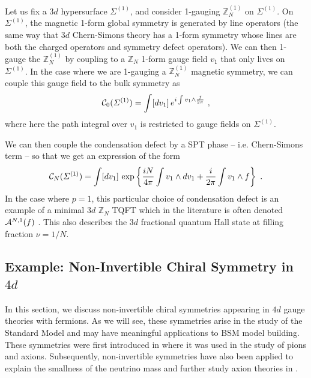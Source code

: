 \documentclass[11pt]{article}
\newcommand{\eq}[1]{\begin{align}\begin{split}#1\end{split}\end{align}}
\def\CA{{\cal A}}
\def\CC {{\cal C}}
\def\IZ{{\mathbb{Z}}}
\begin{document}
Let us fix a $3d$ hypersurface $\Sigma^{(1)}$, and consider 1-gauging $\IZ_N^{(1)}$ on $\Sigma^{(1)}$. On $\Sigma^{(1)}$, the magnetic 1-form global symmetry is generated by line operators (the same way that $3d$ Chern-Simons theory has a 1-form symmetry whose lines are both the charged operators and symmetry defect operators). We can then 1-gauge the $\IZ_N^{(1)}$  by coupling to a $\IZ_N$ 1-form gauge field $v_1$ that only lives on $\Sigma^{(1)}$. In the case where we are 1-gauging a $\IZ_N^{(1)}$ magnetic symmetry, we can couple this gauge field to the bulk symmetry as 
\eq{\label{CCfirstminimalex}
\CC_{0}(\Sigma^{(1)})=\int [dv_1] \,e^{ i  \int v_1\wedge \frac{f}{2\pi}}~, 
}
where here the path integral over $v_1$ is restricted to gauge fields on $\Sigma^{(1)}$.  

We can then couple the condensation defect by a SPT phase -- i.e. Chern-Simons term -- so that we get an expression of the form 
\eq{\label{CNcondensation}
\CC_{N}(\Sigma^{(1)})=\int [dv_1]~{\rm exp}\left\{\frac{iN}{4\pi}\int v_1\wedge dv_1+\frac{i }{2\pi} \int v_1\wedge f\right\}~.
}
In the case where $p=1$, this particular choice of condensation defect is an example of a minimal $3d$ $\IZ_N$ TQFT which in the literature is often denoted $\CA^{N,1}(f)$  \cite{Hsin:2018vcg}. This also describes the $3d$ fractional quantum Hall state at filling fraction $\nu=1/N$. 
 



\subsection{Example: Non-Invertible Chiral Symmetry in $4d$}


In this section, we discuss non-invertible chiral symmetries appearing in $4d$ gauge theories with fermions. As we will see, these symmetries arise in the study of the Standard Model  and may have meaningful applications to BSM model building. These symmetries were first introduced in \cite{Cordova:2022ieu,Choi:2022jqy} where it was used in the study of pions and axions.  Subsequently, non-invertible symmetries have also been 
applied to explain the smallness of the neutrino mass \cite{Cordova:2022fhg} and further study axion theories in \cite{Choi:2022rfe}. 
\end{document}
